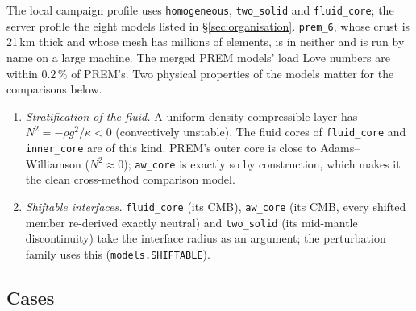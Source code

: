 \documentclass[11pt]{article}
\numberwithin{equation}{section}
\newcommand{\code}[1]{\texttt{#1}}
\begin{document}
\noindent The local campaign profile uses \code{homogeneous},
\code{two\_solid} and \code{fluid\_core}; the server profile the eight
models listed in \S\ref{sec:organisation}. \code{prem\_6}, whose crust is
21\,km thick and whose mesh has millions of elements, is in neither and is
run by name on a large machine. The merged PREM models' load Love numbers
are within $0.2\,\%$ of PREM's. Two physical properties of the models
matter for the comparisons below.
\begin{enumerate}[leftmargin=*]
\item \emph{Stratification of the fluid.} A uniform-density compressible
  layer has $N^2=-\rho g^2/\kappa<0$ (convectively unstable). The fluid
  cores of \code{fluid\_core} and \code{inner\_core} are of this kind.
  PREM's outer core is close to Adams--Williamson ($N^2\approx 0$);
  \code{aw\_core} is exactly so by construction, which makes it the
  clean cross-method comparison model.
\item \emph{Shiftable interfaces.} \code{fluid\_core} (its CMB),
  \code{aw\_core} (its CMB, every shifted member re-derived exactly
  neutral) and \code{two\_solid} (its mid-mantle discontinuity) take
  the interface radius as an argument; the perturbation family uses
  this (\code{models.SHIFTABLE}).
\end{enumerate}

\subsection{Cases}
\label{sec:cases}
\end{document}

